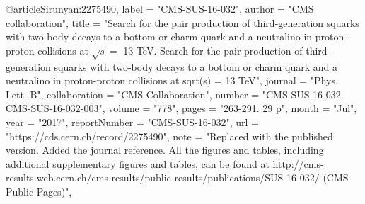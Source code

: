 @article{Sirunyan:2275490,
      label          = "CMS-SUS-16-032",
      author        = "{CMS collaboration}",
      title         = "{Search for the pair production of third-generation
                       squarks with two-body decays to a bottom or charm quark and
                       a neutralino in proton-proton collisions at $ \sqrt{s} = $
                       13 TeV. Search for the pair production of third-generation
                       squarks with two-body decays to a bottom or charm quark and
                       a neutralino in proton-proton collisions at sqrt(s) = 13
                       TeV}",
      journal       = "Phys. Lett. B",
      collaboration = "CMS Collaboration",
      number        = "CMS-SUS-16-032. CMS-SUS-16-032-003",
      volume        = "778",
      pages         = "263-291. 29 p",
      month         = "Jul",
      year          = "2017",
      reportNumber  = "CMS-SUS-16-032",
      url           = "https://cds.cern.ch/record/2275490",
      note          = "Replaced with the published version. Added the journal
                       reference. All the figures and tables, including additional
                       supplementary figures and tables, can be found at
                       http://cms-results.web.cern.ch/cms-results/public-results/publications/SUS-16-032/
                       (CMS Public Pages)",
}

